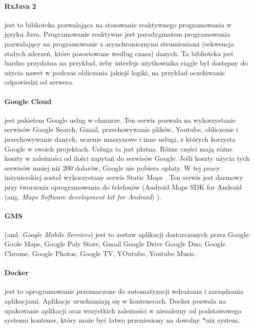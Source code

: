 \paragraph{RxJava 2} jest to biblioteka pozwalająca na stosowanie reaktywnego programowania w języku Java. Programowanie reaktywne jest paradygmatem programowania pozwalający na programowanie z asynchronicznymi strumieniami (sekwencja stałych zderzeń, które posortowane według czasu) danych.
Ta biblioteka jest bardzo przydatna na przykład, żeby interfejs użytkownika ciągle był dostępny do użycia nawet w podczas obliczania jakiejś logiki, na przykład oczekiwanie odpowiedzi od serwera.

\paragraph{Google Cloud} \cite{google_cloud} jest pakietem Google usług w chmurze. Ten serwis pozwala na wykorzystanie serwisów Google Search, Gmail, przechowywanie plików, Youtube, obliczenie i przechowywanie danych, uczenie maszynowe i inne usługi, z których korzysta Google w swoich projektach.
Usługa ta jest płatna. Różne części mają różne koszty w zależności od ilości zapytań do serwisów Google. Jeśli koszty użycia tych serwisów mniej niż 200 dolarów, Google nie pobiera opłaty. W tej pracy inżynierskiej został wykorzystany serwis Static Maps \cite{google_cloud_pricing}.
Ten serwis jest darmowy przy tworzeniu oprogramowania do telefonów (Android Maps SDK for Android (ang. \textit{Maps Software development kit for Android}) \cite{maps_sdk}).

\paragraph{GMS}  (and. \textit{Google Mobile Services}) jest to zestaw aplikacji dostarczonych przez Google: Goole Maps, Google Paly Store, Gmail Google Drive Google Duo, Google Chrome, Google Photos, Google TV, YOutube, Youtube Music.

\paragraph{Docker} \cite{docker,docker_doc} jest to oprogramowanie przeznaczone do automatyzacji wdrażania i zarządzania aplikacjami. Aplikacje uruchamiają się w kontenerach. Docker pozwala na upakowanie aplikacji oraz wszystkich zależności w niezależny od podstawowego systemu kontener, który może być łatwo przeniesiony na dowolny *nix system.

